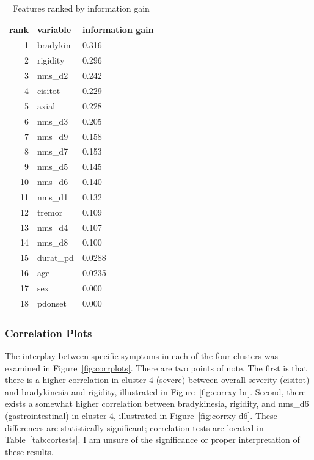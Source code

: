 \documentclass[10pt]{article}
\begin{document}
\begin{table}[h]
  \centering
  \begin{tabular}{r|l|l}
    rank & variable & information gain \\
    \hline
    1 & bradykin      & 0.316 \\
    2 & rigidity      & 0.296 \\
    3 & nms\_d2      & 0.242 \\
    4 & cisitot      & 0.229 \\
    5 & axial      & 0.228 \\
    6 & nms\_d3      & 0.205 \\
    7 & nms\_d9      & 0.158 \\
    8 & nms\_d7      & 0.153 \\
    9 & nms\_d5      & 0.145 \\
    10 & nms\_d6      & 0.140 \\
    11 & nms\_d1      & 0.132 \\
    12 & tremor      & 0.109 \\
    13 & nms\_d4      & 0.107 \\
    14 & nms\_d8      & 0.100 \\
    15 & durat\_pd      & 0.0288 \\
    16 & age      & 0.0235 \\
    17 & sex      & 0.000 \\
    18 & pdonset      & 0.000 \\
  \end{tabular}
  \caption{Features ranked by information gain}
  \label{tab:info_gain}
\end{table}

\subsubsection{Correlation Plots}

The interplay between specific symptoms in each of the four clusters was
examined in Figure~\ref{fig:corrplots}. There are two points of note. The first
is that there is a higher correlation in cluster 4 (severe) between overall
severity (cisitot) and bradykinesia and rigidity, illustrated in
Figure~\ref{fig:corrxy-br}.
Second, there exists a somewhat higher correlation between
bradykinesia, rigidity, and nms\_d6 (gastrointestinal) in cluster 4,
illustrated in Figure~\ref{fig:corrxy-d6}. These differences are statistically
significant; correlation tests are located in Table~\ref{tab:cortests}. I am
unsure of the significance or proper interpretation of these results.
\end{document}
